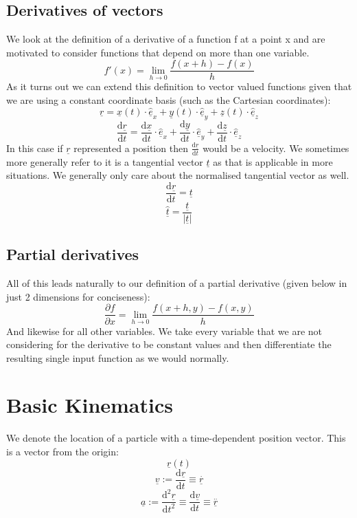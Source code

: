 \documentclass[12pt]{article}
\newcommand{\uvec}[1]{\underline{\hat{#1}}}
\newcommand{\bvec}[1]{\uvec{e}_#1}
\newcommand{\df}[2]{\frac{\text{d}#1}{\text{d}#2}}
\begin{document}
\subsection*{Derivatives of vectors}
We look at the definition of a derivative of a function f at a point x and are motivated to consider functions that depend on more than one variable.
\[f'(x)=\lim_{h\to0}\frac{f(x+h)-f(x)}{h}\]
As it turns out we can extend this definition to vector valued functions given that we are using a constant coordinate basis (such as the Cartesian coordinates):
\[\underline{r}=\underline{x}(t)\cdot\bvec{x}+\underline{y}(t)\cdot\bvec{y}+\underline{z}(t)\cdot\bvec{z}\]
\[\df{\underline{r}}{t}=\df{\underline{x}}{t}\cdot\bvec{x}+\df{\underline{y}}{t}\cdot\bvec{y}+\df{\underline{z}}{t}\cdot\bvec{z}\]
In this case if \(\underline{r}\) represented a position then \(\df{\underline{r}}{t}\) would be a velocity. We sometimes more generally refer to it is a tangential vector \(\underline{t}\) as that is applicable in more situations. We generally only care about the normalised tangential vector as well.
\[\df{\underline{r}}{t}=\underline{t}\]
\[\uvec{t}=\frac{\underline{t}}{\vert \underline{t}\vert}\]
\subsection*{Partial derivatives}
All of this leads naturally to our definition of a partial derivative (given below in just 2 dimensions for conciseness):
\[\frac{\partial f}{\partial x}=\lim_{h\to0}\frac{f(x+h,y)-f(x,y)}{h}\]
And likewise for all other variables. We take every variable that we are not considering for the derivative to be constant values and then differentiate the resulting single input function as we would normally.
\section{Basic Kinematics}
We denote the location of a particle with a time-dependent position vector. This is a vector from the origin:
\[\underline{r}(t)\]
\[\underline{v}:=\df{\underline{r}}{t}\equiv\overset{.}{\underline{r}}\]
\[\underline{a}:=\df{^2\underline{r}}{t^2}\equiv\df{\underline{v}}{t}\equiv\overset{..}{\underline{r}}\]
\end{document}
